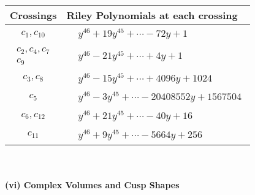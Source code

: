 \documentclass[1p]{elsarticle_modified}
\theoremstyle{definition}
\begin{document}
\begin{tabular}{m{50pt}|m{274pt}}
Crossings & \hspace{64pt}Riley Polynomials at each crossing \\
\hline $$\begin{aligned}c_{1},c_{10}\end{aligned}$$&$\begin{aligned}
&y^{46}+19 y^{45}+\cdots-72 y+1
\end{aligned}$\\
\hline $$\begin{aligned}c_{2},c_{4},c_{7}\\c_{9}\end{aligned}$$&$\begin{aligned}
&y^{46}-21 y^{45}+\cdots+4 y+1
\end{aligned}$\\
\hline $$\begin{aligned}c_{3},c_{8}\end{aligned}$$&$\begin{aligned}
&y^{46}-15 y^{45}+\cdots+4096 y+1024
\end{aligned}$\\
\hline $$\begin{aligned}c_{5}\end{aligned}$$&$\begin{aligned}
&y^{46}-3 y^{45}+\cdots-20408552 y+1567504
\end{aligned}$\\
\hline $$\begin{aligned}c_{6},c_{12}\end{aligned}$$&$\begin{aligned}
&y^{46}+21 y^{45}+\cdots-40 y+16
\end{aligned}$\\
\hline $$\begin{aligned}c_{11}\end{aligned}$$&$\begin{aligned}
&y^{46}+9 y^{45}+\cdots-5664 y+256
\end{aligned}$\\
\hline
\end{tabular}\\~\\
\newpage\flushleft \textbf{(vi) Complex Volumes and Cusp Shapes}
\end{document}
